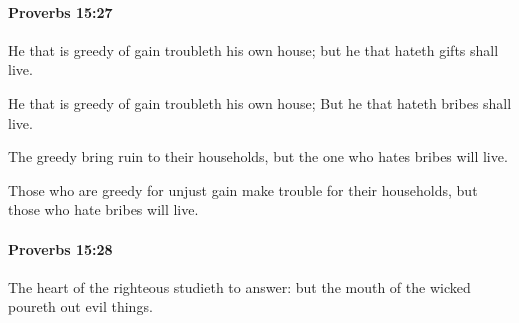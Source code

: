 		\paragraph{Proverbs 15:27} %
			\label{PROVERBS-15-27}

			He that is greedy of gain troubleth his own house; but he that hateth gifts shall live.

			\begin{versebox}
					\item[BHS] 
					\item[ASV] He that is greedy of gain troubleth his own house; But he that hateth bribes shall live.
					\item[NIV] The greedy bring ruin to their households, but the one who hates bribes will live.
					\item[NRSV] Those who are greedy for unjust gain make trouble for their households, but those who hate bribes will live.
			\end{versebox}

		\paragraph{Proverbs 15:28} %
			\label{PROVERBS-15-28}

			The heart of the righteous studieth to answer: but the mouth of the wicked poureth out evil things.

